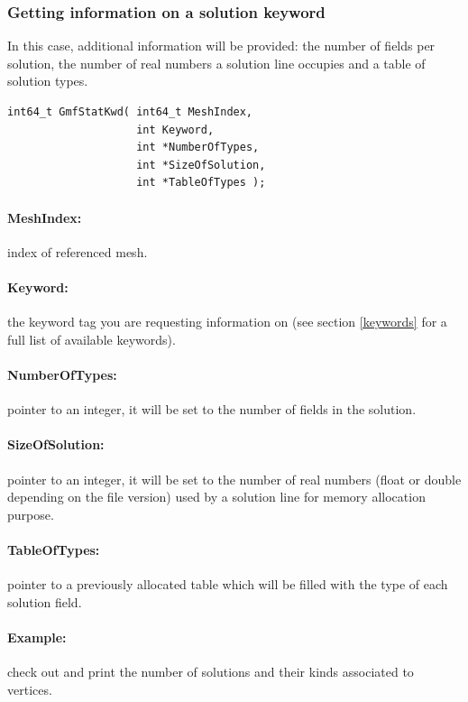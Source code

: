 \documentclass[a4paper,12pt]{article}
\begin{document}
\subsubsection{Getting information on a solution keyword}
In this case, additional information will be provided: the number of fields per solution, the number of real numbers a solution line occupies and a table of solution types.

\begin{tt}
\begin{verbatim}
int64_t GmfStatKwd( int64_t MeshIndex,
                    int Keyword,
                    int *NumberOfTypes,
                    int *SizeOfSolution,
                    int *TableOfTypes );
\end{verbatim}
\end{tt}
\normalfont

\paragraph{MeshIndex:} index of referenced mesh.

\paragraph{Keyword:} the keyword tag you are requesting information on (see section \ref{keywords} for a full list of available keywords).

\paragraph{NumberOfTypes:} pointer to an integer, it will be set to the number of fields in the solution.

\paragraph{SizeOfSolution:} pointer to an integer, it will be set to the number of real numbers (float or double depending on the file version) used by a solution line for memory allocation purpose.

\paragraph{TableOfTypes:} pointer to a previously allocated table which will be filled with the type of each solution field.

\paragraph{Example:} check out and print the number of solutions and their kinds associated to vertices.
\end{document}
